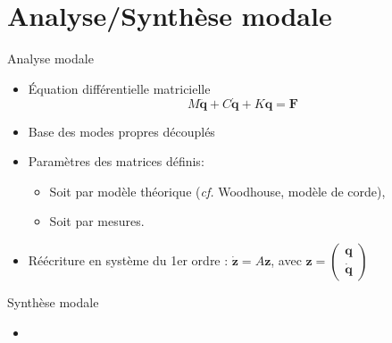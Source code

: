 \section{Analyse/Synthèse modale}

\begin{frame}{Analyse modale}
 \begin{itemize}
  \item Équation différentielle matricielle
    \[ M \ddot{\bm{q}} + C \dot{\bm{q}} + K \bm{q} = \bm{F} \]
  \item Base des modes propres découplés
  \item Paramètres des matrices définis:
    \begin{itemize}
     \item Soit par modèle théorique (\emph{cf.} Woodhouse, modèle de corde),
     \item Soit par mesures.
    \end{itemize}
  \item Réécriture en système du 1er ordre : \( \dot{\bm{z}} = A\bm{z} \), avec
    \( \bm{z} = \begin{pmatrix}
                 \bm{q} \\
		 \dot{\bm{q}}
                \end{pmatrix} \)
 \end{itemize}
\end{frame}

\begin{frame}{Synthèse modale}
 \begin{itemize}
  \item 
 \end{itemize}
\end{frame}
